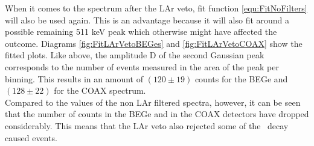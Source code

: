\documentclass[encoding=utf8,british]{tumphthesis}
\begin{document}
When it comes to the spectrum after the LAr veto, fit function \ref{equ:FitNoFilters} will also be used again.
This is an advantage because it will also fit around a possible remaining 511 keV peak which otherwise might have affected the outcome.
Diagrams \ref{fig:FitLArVetoBEGes} and \ref{fig:FitLArVetoCOAX} show the fitted plots.
Like above, the amplitude D of the second Gaussian peak corresponds to the number of events measured in the area of the peak per binning.
This results in an amount of $(120\pm19)$ counts for the BEGe and $(128\pm22)$ for the COAX spectrum.
\\

Compared to the values of the non LAr filtered spectra, however, it can be seen that the number of counts in the BEGe and in the COAX detectors have dropped considerably.
This means that the LAr veto also rejected some of the \Kr\ decay caused events.
\\
\end{document}
